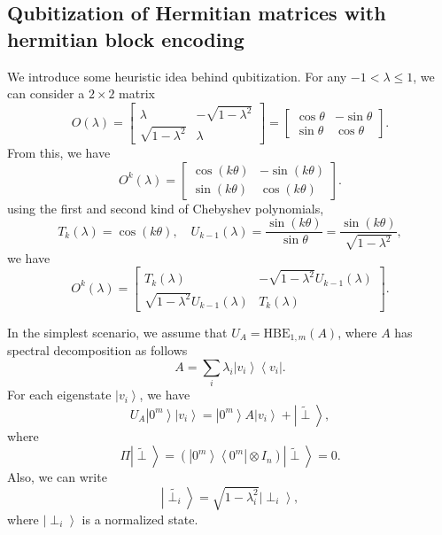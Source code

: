 \documentclass[11pt]{article}
\newcommand{\bra}[1]{\left\langle #1\right|}
\newcommand{\ket}[1]{\left|#1\right\rangle}
\begin{document}
\subsection{Qubitization of Hermitian matrices with hermitian block encoding}
We introduce some heuristic idea behind qubitization. For any $-1<\lambda\leq 1$, we can consider a $2\times 2$ matrix 
\begin{equation}
    O(\lambda) = \begin{bmatrix}
        \lambda & -\sqrt{1-\lambda^2} \\
        \sqrt{1-\lambda^2} & \lambda
    \end{bmatrix} =
    \begin{bmatrix}
        \cos\theta & -\sin\theta \\
        \sin\theta & \cos\theta
    \end{bmatrix}.
\end{equation}
From this, we have 
\begin{equation}
    O^k(\lambda) = \begin{bmatrix}
        \cos(k\theta) & -\sin(k\theta) \\
        \sin(k\theta) & \cos(k\theta)
    \end{bmatrix}.
\end{equation}
using the first and second kind of Chebyshev polynomials, 
\begin{equation}
    T_k(\lambda) = \cos(k\theta), \quad U_{k-1}(\lambda) = \frac{\sin(k\theta)}{\sin\theta} = \frac{\sin(k\theta)}{\sqrt{1 - \lambda^2}},
\end{equation}
we have 
\begin{equation}
    O^k(\lambda) = \begin{bmatrix}
        T_k(\lambda) & -\sqrt{1-\lambda^2}U_{k-1}(\lambda) \\
        \sqrt{1 - \lambda^2}U_{k-1}(\lambda) & T_k(\lambda)
    \end{bmatrix}.
\end{equation}

In the simplest scenario, we assume that $U_A = \text{HBE}_{1,m}(A)$, where $A$ has spectral decomposition as follows 
\begin{equation}
    A = \sum_i\lambda_i\ket{v_i}\bra{v_i}.
\end{equation}
For each eigenstate $\ket{v_i}$, we have 
\begin{equation}
    U_A\ket{0^m}\ket{v_i} = \ket{0^m}A\ket{v_i} + \ket{\tilde{\perp}},
\end{equation}
where 
\begin{equation}
    \Pi\ket{\tilde{\perp}} = (\ket{0^m}\bra{0^m}\otimes I_n)\ket{\tilde{\perp}} = 0.
\end{equation}
Also, we can write 
\begin{equation}
    \ket{\tilde{\perp_i} } = \sqrt{1 - \lambda^2_i}\ket{\perp_i},
\end{equation}
where $\ket{\perp_i}$ is a normalized state. 
\end{document}
